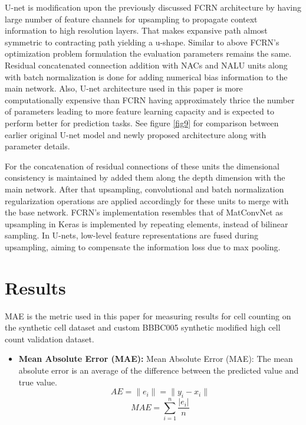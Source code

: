 \documentclass[runningheads]{llncs}
\begin{document}
U-net is modification upon the previously discussed FCRN architecture by having large number of feature channels for upsampling to propagate context information to high resolution layers. That makes expansive path almost symmetric to contracting path yielding a u-shape. Similar to above FCRN's optimization problem formulation the evaluation parameters remains the same. Residual concatenated connection addition with NACs and NALU units along with batch normalization is done for adding numerical bias information to the main network. Also, U-net architecture used in this paper is more computationally expensive than FCRN having approximately thrice the number of parameters leading to more feature learning capacity and is expected to perform better for prediction tasks. See figure \ref{fig9} for comparison between earlier original U-net model and newly proposed architecture along with parameter details.

For the concatenation of residual connections of these units the dimensional consistency is maintained by added them along the depth dimension with the main network. After that upsampling, convolutional and batch normalization regularization operations are applied accordingly for these units to merge with the base network. FCRN’s implementation resembles that of MatConvNet \cite{b30} as upsampling in Keras is implemented by repeating elements, instead of bilinear sampling. In U-nets, low-level feature representations are fused during upsampling, aiming to compensate the information loss due to max pooling.

\section{Results}

MAE is the metric used in this paper for measuring results for cell counting on the synthetic cell dataset \cite{b29} and custom BBBC005 synthetic modified high cell count validation dataset.

\begin{itemize}
\item \textbf{Mean Absolute Error (MAE):}
Mean Absolute Error (MAE): The mean absolute error is an average of the difference between the predicted value and true value.
\begin{equation}
AE = \|e_i\| = \|y_i - x_i\|
\end{equation}
\begin{equation}
MAE = \sum_{i=1}^{n} \frac{|e_i|}{n}
\end{equation}
\end{itemize}
\end{document}
